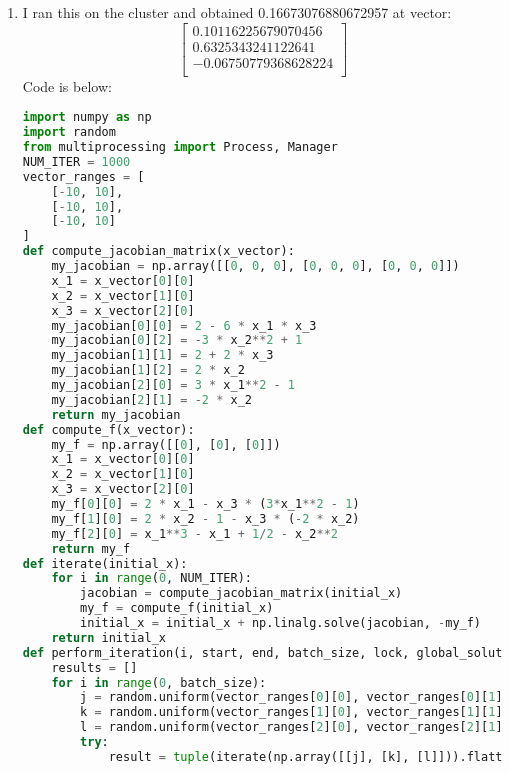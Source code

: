 \documentclass{article}
\begin{document}
\begin{enumerate}[label=\alph*.)]
\item I ran this on the cluster and obtained 0.16673076880672957 at vector: \\
\[
\begin{bmatrix}
0.10116225679070456\\
0.6325343241122641 \\
-0.06750779368628224 \\
\end{bmatrix}
\]
Code is below: \\
\begin{lstlisting}[language=Python]
import numpy as np
import random
from multiprocessing import Process, Manager
NUM_ITER = 1000
vector_ranges = [
    [-10, 10],
    [-10, 10],
    [-10, 10]
]
def compute_jacobian_matrix(x_vector):
    my_jacobian = np.array([[0, 0, 0], [0, 0, 0], [0, 0, 0]])
    x_1 = x_vector[0][0]
    x_2 = x_vector[1][0]
    x_3 = x_vector[2][0]
    my_jacobian[0][0] = 2 - 6 * x_1 * x_3
    my_jacobian[0][2] = -3 * x_2**2 + 1
    my_jacobian[1][1] = 2 + 2 * x_3
    my_jacobian[1][2] = 2 * x_2
    my_jacobian[2][0] = 3 * x_1**2 - 1
    my_jacobian[2][1] = -2 * x_2
    return my_jacobian
def compute_f(x_vector):
    my_f = np.array([[0], [0], [0]])
    x_1 = x_vector[0][0]
    x_2 = x_vector[1][0]
    x_3 = x_vector[2][0]
    my_f[0][0] = 2 * x_1 - x_3 * (3*x_1**2 - 1)
    my_f[1][0] = 2 * x_2 - 1 - x_3 * (-2 * x_2)
    my_f[2][0] = x_1**3 - x_1 + 1/2 - x_2**2
    return my_f
def iterate(initial_x):
    for i in range(0, NUM_ITER):
        jacobian = compute_jacobian_matrix(initial_x)
        my_f = compute_f(initial_x)
        initial_x = initial_x + np.linalg.solve(jacobian, -my_f)
    return initial_x
def perform_iteration(i, start, end, batch_size, lock, global_solutions):
    results = []
    for i in range(0, batch_size):
        j = random.uniform(vector_ranges[0][0], vector_ranges[0][1])
        k = random.uniform(vector_ranges[1][0], vector_ranges[1][1])
        l = random.uniform(vector_ranges[2][0], vector_ranges[2][1])
        try:
            result = tuple(iterate(np.array([[j], [k], [l]])).flatten())
            

\end{lstlisting}
\end{enumerate}
\end{document}
